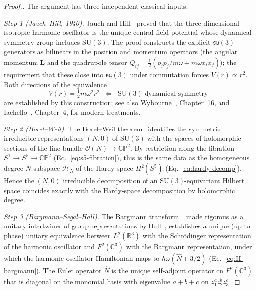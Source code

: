 \documentclass[twocolumn,pra,amsmath,amssymb,superscriptaddress]{revtex4-2}
\begin{document}
\begin{proof}[Proof.]
The argument has three independent classical inputs.

\emph{Step 1 (Jauch--Hill, 1940).}  Jauch and
Hill~\cite{jauchhill1940} proved that the three-dimensional
isotropic harmonic oscillator is the unique central-field
potential whose dynamical symmetry group includes
$\mathrm{SU}(3)$.  The proof constructs the explicit
$\mathfrak{su}(3)$ generators as bilinears in the position and
momentum operators (the angular momentum $\mathbf{L}$ and the
quadrupole tensor $Q_{ij} = \frac{1}{2}(p_i p_j / m\omega +
m\omega x_i x_j)$); the requirement that these close into
$\mathfrak{su}(3)$ under commutation forces $V(r) \propto r^2$.
Both directions of the equivalence
\[
  V(r) = \tfrac{1}{2} m\omega^2 r^2
  \;\;\Longleftrightarrow\;\;
  \mathrm{SU}(3)\text{ dynamical symmetry}
\]
are established by this construction; see also
Wybourne~\cite{wybourne1974}, Chapter~16, and
Iachello~\cite{iachello2006}, Chapter~4, for modern treatments.

\emph{Step 2 (Borel--Weil).}  The Borel--Weil
theorem~\cite{borelweil} identifies the symmetric irreducible
representations $(N, 0)$ of $\mathrm{SU}(3)$ with the spaces of
holomorphic sections of the line bundle $\mathcal{O}(N) \to
\mathbb{CP}^2$.  By restriction along the fibration $S^1 \to S^5
\to \mathbb{CP}^2$ (Eq.~\eqref{eq:s5-fibration}), this is the
same data as the homogeneous degree-$N$ subspace
$\mathcal{H}_N$ of the Hardy space $H^2(S^5)$
(Eq.~\eqref{eq:hardy-decomp}).  Hence the $(N, 0)$ irreducible
decomposition of an $\mathrm{SU}(3)$-equivariant Hilbert space
coincides exactly with the Hardy-space decomposition by
holomorphic degree.

\emph{Step 3 (Bargmann--Segal--Hall).}  The Bargmann
transform~\cite{bargmann1961}, made rigorous as a unitary
intertwiner of group representations by
Hall~\cite{hall1994}, establishes a unique (up to phase)
unitary equivalence between $L^2(\mathbb{R}^3)$ with the
Schr\"odinger representation of the harmonic oscillator and
$F^2(\mathbb{C}^3)$ with the Bargmann representation, under
which the harmonic oscillator Hamiltonian maps to
$\hbar\omega(\hat{N} + 3/2)$ (Eq.~\eqref{eq:H-bargmann}).
The Euler operator $\hat{N}$ is the unique self-adjoint operator
on $F^2(\mathbb{C}^3)$ that is diagonal on the monomial basis
with eigenvalue $a + b + c$ on $z_1^a z_2^b z_3^c$.


\end{proof}
\end{document}
